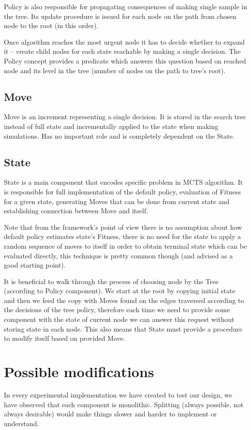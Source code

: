 Policy is also responsible for propagating consequences of making single
sample in the tree. Its update procedure is issued for each node on the path
from chosen node to the root (in this order).

Once algorithm reaches the most urgent node it has to decide whether to expand
it -- create child nodes for each state reachable by making a single decision.
The Policy concept provides a predicate which answers this question based on
reached node and its level in the tree (number of nodes on the path to tree's
root).

\subsection{Move}
Move is an increment representing a single decision. It is stored in the search
tree instead of full state and incrementally applied to the state when making
simulations. Has no important role and is completely dependent on the State.

\subsection{State}
State is a main component that encodes specific problem in MCTS algorithm.  It
is responsible for full implementation of the default policy, evaluation of Fitness
for a given state, generating Moves that can be done from current state and
establishing connection between Move and itself.

Note that from the framework's point of view there is no assumption about how
default policy estimates state's Fitness, there is no need for the state to
apply a random sequence of moves to itself in order to obtain terminal state
which can be evaluated directly, this technique is pretty common though (and
advised as a good starting point).

It is beneficial to walk through the process of choosing node by the Tree
(according to Policy component). We start at the root by copying initial state
and then we feed the copy with Moves found on the edges traversed according to
the decisions of the tree policy, therefore each time we need to provide some
component with the state of current node we can answer this request without
storing state in each node. This also means that State must provide a procedure
to modify itself based on provided Move.

\section{Possible modifications}
In every experimental implementation we have created to test our design, we
have observed that each component is monolithic. Splitting (always possible,
not always desirable) would make things slower and harder to implement or
understand.

